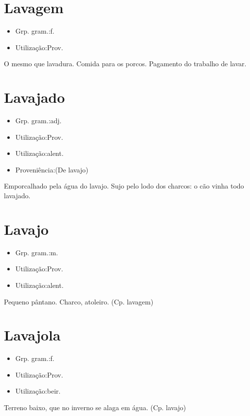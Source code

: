 \section{Lavagem}
\begin{itemize}
\item {Grp. gram.:f.}
\end{itemize}
\begin{itemize}
\item {Utilização:Prov.}
\end{itemize}
O mesmo que \textunderscore lavadura\textunderscore .
Comida para os porcos.
Pagamento do trabalho de lavar.
\section{Lavajado}
\begin{itemize}
\item {Grp. gram.:adj.}
\end{itemize}
\begin{itemize}
\item {Utilização:Prov.}
\end{itemize}
\begin{itemize}
\item {Utilização:alent.}
\end{itemize}
\begin{itemize}
\item {Proveniência:(De \textunderscore lavajo\textunderscore )}
\end{itemize}
Emporcalhado pela água do lavajo.
Sujo pelo lodo dos charcos: \textunderscore o cão vinha todo lavajado\textunderscore .
\section{Lavajo}
\begin{itemize}
\item {Grp. gram.:m.}
\end{itemize}
\begin{itemize}
\item {Utilização:Prov.}
\end{itemize}
\begin{itemize}
\item {Utilização:alent.}
\end{itemize}
Pequeno pântano.
Charco, atoleiro.
(Cp. \textunderscore lavagem\textunderscore )
\section{Lavajola}
\begin{itemize}
\item {Grp. gram.:f.}
\end{itemize}
\begin{itemize}
\item {Utilização:Prov.}
\end{itemize}
\begin{itemize}
\item {Utilização:beir.}
\end{itemize}
Terreno baixo, que no inverno se alaga em água.
(Cp. \textunderscore lavajo\textunderscore )
